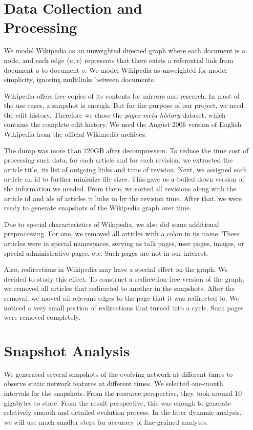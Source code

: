 \documentclass[10pt,twocolumn]{article}
\begin{document}
\section{Data Collection and\\ Processing}
We model Wikipedia as an unweighted directed graph where each document is a node, and each edge $\langle u, v \rangle$ represents that there exists a referential link from document $u$ to document $v$. We model Wikipedia as unweighted for model simplicity, ignoring multilinks between documents.

Wikipedia offers free copies of its contents for mirrors and research. In most of the use cases, a snapshot is enough. But for the purpose of our project, we need the edit history. Therefore we chose the {\it pages-meta-history} dataset, which contains the complete edit history. We used the August 2006 version of English Wikipedia from the official Wikimedia archives.

The dump was more than 720GB after decompression. To reduce the time cost of processing such data, for each article and for each revision, we extracted the article title, its list of outgoing links and time of revision. Next, we assigned each article an id to further minimize file sizes. This gave us a boiled down version of the information we needed. From there, we sorted all revisions along with the article id and ids of articles it links to by the revision time. After that, we were ready to generate snapshots of the Wikipedia graph over time.

Due to special characteristics of Wikipedia, we also did some additional preprocessing. For one, we removed all articles with a colon in its name. These articles were in special namespaces, serving as talk pages, user pages, images, or special administrative pages, etc. Such pages are not in our interest.

Also, redirections in Wikipedia may have a special effect on the graph. We decided to study this effect. To construct a redirection-free version of the graph, we removed all articles that redirected to another in the snapshots. After the removal, we moved all relevant edges to the page that it was redirected to. We noticed a very small portion of redirections that turned into a cycle. Such pages were removed completely.

\section{Snapshot Analysis}
We generated several snapshots of the evolving network at different times to observe static network features at different times. We selected one-month intervals for the snapshots. From the resource perspective, they took around 10 gigabytes to store. From the result perspective, this was enough to generate relatively smooth and detailed evolution process. In the later dynamic analysis, we will use much smaller steps for accuracy of fine-grained analyses.
\end{document}
